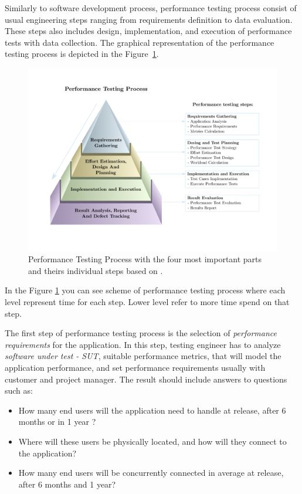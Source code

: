 Similarly to software development process, performance testing process consist of usual engineering steps ranging from requirements definition to data evaluation. These steps also includes design, implementation, and execution of performance tests with data collection. The graphical representation of the performance testing process is depicted in the Figure~\ref{fig:performace_testing_process}. 

\begin{figure}[H]
  \includegraphics[width=16cm]{obrazky-figures/pyramid.pdf}
  \captionsetup{justification=centering}
  \caption{Performance Testing Process with the four most important parts and theirs individual steps based on \cite{Sharma:HP}.}
  \label{fig:performace_testing_process}
\end{figure}
In the Figure \ref{fig:performace_testing_process} you can see scheme of performance testing process where each level represent time for each step. Lower level refer to more time spend on that step.

The first step of performance testing process is the selection of \emph{performance requirements} for the application. In this step, testing engineer has to analyze \emph{software under test - SUT}, suitable performance metrics, that will model the application performance, and set performance requirements usually with customer and project manager. The result should include answers to questions such as:

\begin{itemize}
	\setlength\itemsep{0em}
	\item How many end users will the application need to handle at release, after 6 months or in 1 year ?
	\item Where will these users be physically located, and how will they connect to the application?
	\item How many end users will be concurrently connected in average at release, after 6 months and 1 year?
\end{itemize}

